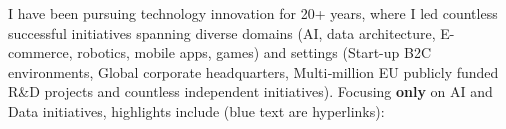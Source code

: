 \clearpage
{}




\vspace{4ex}


\vspace{2ex}

I have been pursuing technology innovation for 20+ years, where I led countless successful initiatives spanning diverse domains (AI, data architecture, E-commerce, robotics, mobile apps, games) and settings (Start-up B2C environments, Global corporate headquarters, Multi‑million EU publicly funded R\&D projects and countless independent initiatives). Focusing \textbf{only} on AI and Data initiatives, highlights include (blue text are hyperlinks):
 

